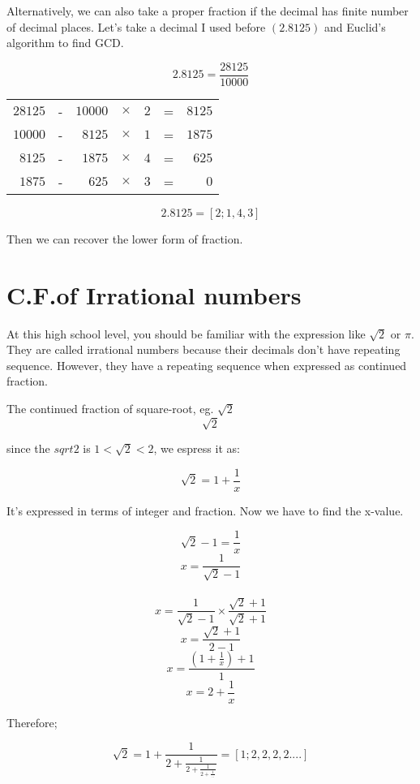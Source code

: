 \documentclass{jreport}
\begin{document}
Alternatively, we can also take a proper fraction if the decimal has finite number of decimal places. Let's take a decimal I used before $(2.8125)$ and Euclid's algorithm to find GCD.

\[2.8125=\frac{28125}{10000}\]
\begin{table}[htbp]
\begin{center}
\begin{tabular}{|rcrcccr|}
\hline
$28125$ & - & $10000$ & $\times$ & $2$ & = & $8125$\\
$10000$ & - & $8125$ & $\times$ & $1$ & = & $1875$\\
$8125$ & - & $1875$ & $\times$ & $4$ & = & $625$\\
$1875$ & - & $625$ & $\times$ & $3$ & = & $0$\\
\hline
\end{tabular}
\end{center}
\end{table}
\[2.8125=[2;1,4,3]\]

Then we can recover the lower form of fraction. 

\section*{C.F.of Irrational numbers}
At this high school level, you should be familiar with the expression like $\sqrt{2}$ or $\pi$. They are called irrational numbers because their decimals don't have repeating sequence. However, they have a repeating sequence when expressed as continued fraction.

The continued fraction of square-root, eg. $\sqrt{2}$
\[\sqrt{2}\]
\begin{center}
since the $sqrt{2}$ is $1<\sqrt{2}<2$, we espress it as:
\end{center}
\[\sqrt{2}=1+\frac{1}{x}\]
\begin{center}
It's expressed in terms of integer and fraction. Now we have to find the x-value.
\end{center}
\[\sqrt{2}-1=\frac{1}{x}\]
\[x=\frac{1}{\sqrt{2}-1}\]\
\[x=\frac{1}{\sqrt{2}-1}\times\frac{\sqrt{2}+1}{\sqrt{2}+1}\]
\[x=\frac{\sqrt{2}+1}{2-1}\]
\[x=\frac{(1+\frac{1}{x})+1}{1}\]
\[x=2+\frac{1}{x}\]

\begin{center}
Therefore;
\end{center}
\[\sqrt{2}=1+\frac{1}{2+\frac{1}{2+\frac{1}{2+\frac{1}{...}}}}=[1;2,2,2,2....]\]
\end{document}
